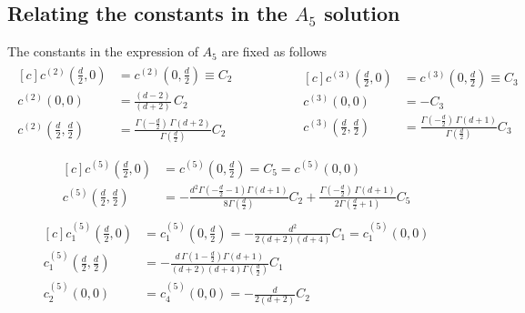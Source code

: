 \documentclass[a4paper,11pt,openright,twoside]{book}
\numberwithin{equation}{section}
\begin{document}
{{\subsection{Relating the constants in the $A_5$ solution}
\label{conditionTTT}
The constants in the expression of $A_5$ are fixed as follows
\begin{align}
	\begin{aligned}[c]
		c^{(2)}\left(\frac{d}{2},0\right)&=c^{(2)}\left(0,\frac{d}{2}\right)\equiv C_2\\
		c^{(2)}\left(0,0\right)&=\frac{(d-2)}{(d+2)}\,C_2\\
		c^{(2)}\left(\frac{d}{2},\frac{d}{2}\right)&=\frac{\Gamma\left(-\frac{d}{2}\right)\,\Gamma\left(d+2\right)}{\Gamma\left(\frac{d}{2}\right)}C_2\\
	\end{aligned}
	\hspace{2cm}
	\begin{aligned}[c]
		c^{(3)}\left(\frac{d}{2},0\right)&=c^{(3)}\left(0,\frac{d}{2}\right)\equiv C_3\\[0.8ex]
		c^{(3)}\left(0,0\right)&=-C_3\\[1ex]
		c^{(3)}\left(\frac{d}{2},\frac{d}{2}\right)&=\frac{\Gamma\left(-\frac{d}{2}\right)\,\Gamma\left(d+1\right)}{\Gamma\left(\frac{d}{2}\right)}C_3\\
	\end{aligned}
\end{align}
\begin{align}
	\begin{aligned}[c]
		c^{(5)}\left(\frac{d}{2},0\right)&=c^{(5)}\left(0,\frac{d}{2}\right)=C_5=c^{(5)}\left(0,0\right)\\
		c^{(5)}\left(\frac{d}{2},\frac{d}{2}\right)&=-\frac{d^2\Gamma\left(-\frac{d}{2}-1\right)\Gamma(d+1)}{8\Gamma\left(\frac{d}{2}\right)}C_2+\frac{\Gamma\left(-\frac{d}{2}\right)\,\Gamma(d+1)}{2\Gamma\left(\frac{d}{2}+1\right)}C_5
	\end{aligned}
\end{align}
\begin{align}
	\begin{aligned}[c]
		c_1^{(5)}\left(\frac{d}{2},0\right)&=c_1^{(5)}\left(0,\frac{d}{2}\right)=-\frac{d^2}{2(d+2)(d+4)}C_1=c_1^{(5)}\left(0,0\right)\\
		c_1^{(5)}\left(\frac{d}{2},\frac{d}{2}\right)&=-\frac{d\,\Gamma\left(1-\frac{d}{2}\right)\Gamma(d+1)}{(d+2)(d+4)\Gamma\left(\frac{d}{2}\right)}C_1\\
		c_2^{(5)}\left(0,0\right)&=c_4^{(5)}\left(0,0\right)=-\frac{d}{2(d+2)}C_2\\

\end{aligned}
\end{align}}}
\end{document}
